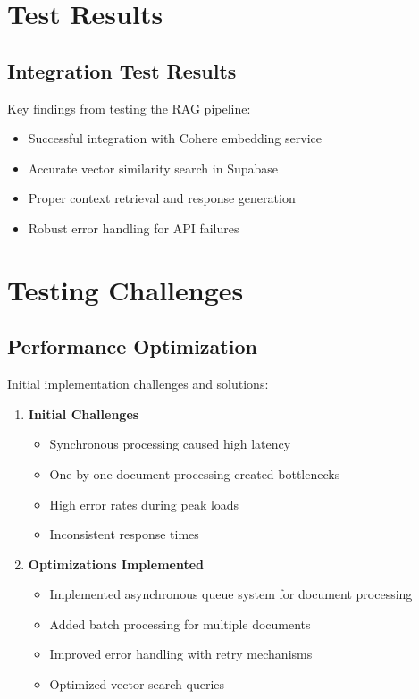 \section{Test Results}

\subsection{Integration Test Results}
Key findings from testing the RAG pipeline:

\begin{itemize}
    \item Successful integration with Cohere embedding service
    \item Accurate vector similarity search in Supabase
    \item Proper context retrieval and response generation
    \item Robust error handling for API failures
\end{itemize}

\section{Testing Challenges}

\subsection{Performance Optimization}
Initial implementation challenges and solutions:

\begin{enumerate}
    \item \textbf{Initial Challenges}
    \begin{itemize}
        \item Synchronous processing caused high latency
        \item One-by-one document processing created bottlenecks
        \item High error rates during peak loads
        \item Inconsistent response times
    \end{itemize}

    \item \textbf{Optimizations Implemented}
    \begin{itemize}
        \item Implemented asynchronous queue system for document processing
        \item Added batch processing for multiple documents
        \item Improved error handling with retry mechanisms
        \item Optimized vector search queries
    \end{itemize}
\end{enumerate}

